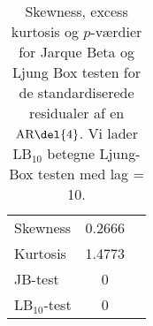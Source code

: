\begin{table}
\center
\begin{tabular}{lcc} \toprule
Skewness & 0.2666 \\
Kurtosis & 1.4773 \\
JB-test & 0 \\ 
LB$_{10}$-test & 0 \\ \bottomrule
\end{tabular}
\caption{Skewness, excess kurtosis og \(p\)-værdier for Jarque Beta og Ljung Box testen for de standardiserede residualer af en \(\text{AR} \del{4}\). Vi lader LB$_{10}$ betegne Ljung-Box testen med lag = 10. } \label{tab:test_ar}
\end{table}
